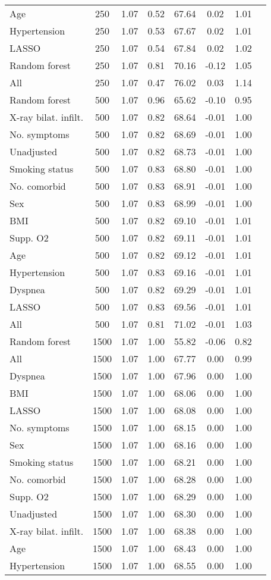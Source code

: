 \documentclass{article}
\begin{document}
{\begin{longtable}{lccccccc}
Age & 250 & 1.07 & 0.52 & 67.64 &  0.02 & 1.01 \\ 
Hypertension & 250 & 1.07 & 0.53 & 67.67 &  0.02 & 1.01 \\ 
LASSO & 250 & 1.07 & 0.54 & 67.84 &  0.02 & 1.02 \\ 
Random forest & 250 & 1.07 & 0.81 & 70.16 & -0.12 & 1.05 \\ 
All & 250 & 1.07 & 0.47 & 76.02 &  0.03 & 1.14 \\ \midrule() 
Random forest & 500 & 1.07 & 0.96 & 65.62 & -0.10 & 0.95 \\ 
X-ray bilat. infilt. & 500 & 1.07 & 0.82 & 68.64 & -0.01 & 1.00 \\ 
No. symptoms & 500 & 1.07 & 0.82 & 68.69 & -0.01 & 1.00 \\ 
Unadjusted & 500 & 1.07 & 0.82 & 68.73 & -0.01 & 1.00 \\ 
Smoking status & 500 & 1.07 & 0.83 & 68.80 & -0.01 & 1.00 \\ 
No. comorbid & 500 & 1.07 & 0.83 & 68.91 & -0.01 & 1.00 \\ 
Sex & 500 & 1.07 & 0.83 & 68.99 & -0.01 & 1.00 \\ 
BMI & 500 & 1.07 & 0.82 & 69.10 & -0.01 & 1.01 \\ 
Supp. O2 & 500 & 1.07 & 0.82 & 69.11 & -0.01 & 1.01 \\ 
Age & 500 & 1.07 & 0.82 & 69.12 & -0.01 & 1.01 \\ 
Hypertension & 500 & 1.07 & 0.83 & 69.16 & -0.01 & 1.01 \\ 
Dyspnea & 500 & 1.07 & 0.82 & 69.29 & -0.01 & 1.01 \\ 
LASSO & 500 & 1.07 & 0.83 & 69.56 & -0.01 & 1.01 \\ 
All & 500 & 1.07 & 0.81 & 71.02 & -0.01 & 1.03 \\ \midrule() 
Random forest & 1500 & 1.07 & 1.00 & 55.82 & -0.06 & 0.82 \\ 
All & 1500 & 1.07 & 1.00 & 67.77 &  0.00 & 0.99 \\ 
Dyspnea & 1500 & 1.07 & 1.00 & 67.96 &  0.00 & 1.00 \\ 
BMI & 1500 & 1.07 & 1.00 & 68.06 &  0.00 & 1.00 \\ 
LASSO & 1500 & 1.07 & 1.00 & 68.08 &  0.00 & 1.00 \\ 
No. symptoms & 1500 & 1.07 & 1.00 & 68.15 &  0.00 & 1.00 \\ 
Sex & 1500 & 1.07 & 1.00 & 68.16 &  0.00 & 1.00 \\ 
Smoking status & 1500 & 1.07 & 1.00 & 68.21 &  0.00 & 1.00 \\ 
No. comorbid & 1500 & 1.07 & 1.00 & 68.28 &  0.00 & 1.00 \\ 
Supp. O2 & 1500 & 1.07 & 1.00 & 68.29 &  0.00 & 1.00 \\ 
Unadjusted & 1500 & 1.07 & 1.00 & 68.30 &  0.00 & 1.00 \\ 
X-ray bilat. infilt. & 1500 & 1.07 & 1.00 & 68.38 &  0.00 & 1.00 \\ 
Age & 1500 & 1.07 & 1.00 & 68.43 &  0.00 & 1.00 \\ 
Hypertension & 1500 & 1.07 & 1.00 & 68.55 &  0.00 & 1.00 \\
\bottomrule
\hline
\end{longtable}
}
\end{document}
